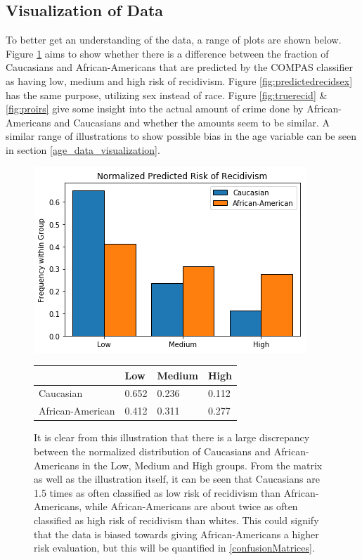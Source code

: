 \documentclass[11pt, fleqn, titlepage]{article}
\begin{document}
	\subsection{Visualization of Data} \label{dataVisuals}
	To better get an understanding of the data, a range of plots are shown below. Figure \ref{fig:predictedrecidrace} aims to show whether there is a difference between the fraction of Caucasians and African-Americans that are predicted by the COMPAS classifier as having low, medium and high risk of recidivism. Figure \ref{fig:predictedrecidsex} has the same purpose, utilizing sex instead of race. Figure \ref{fig:truerecid} \& \ref{fig:proirs} give some insight into the actual amount of crime done by African-Americans and Caucasians and whether the amounts seem to be similar. A similar range of illustrations to show possible bias in the age variable can be seen in section \ref{age_data_visualization}.
	
	\begin{figure}[H]
		\centering
		\includegraphics[width=0.5\linewidth]{imgs/normalized_recid_race}	
		\begin{table}[H]
			\centering
			\begin{tabular}{|l|l|l|l|}
				\hline
				& Low   & Medium & High  \\ \hline
				Caucasian        & 0.652 & 0.236  & 0.112 \\ \hline
				African-American & 0.412 & 0.311  & 0.277 \\ \hline
			\end{tabular}
		\end{table}
		\caption{It is clear from this illustration that there is a large discrepancy between the normalized distribution of Caucasians and African-Americans in the Low, Medium and High groups. From the matrix as well as the illustration itself, it can be seen that Caucasians are 1.5 times as often classified as low risk of recidivism than African-Americans, while African-Americans are about twice as often classified as high risk of recidivism than whites. This could signify that the data is biased towards giving African-Americans a higher risk evaluation, but this will be quantified in \ref{confusionMatrices}.}
		\label{fig:predictedrecidrace}
	\end{figure}
\end{document}
